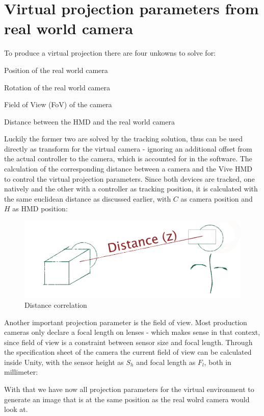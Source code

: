%
\section{Virtual projection parameters from real world camera}

To produce a virtual projection there are four unkowns to solve for:

\begin{my_list}
	\item Position of the real world camera
	\item Rotation of the real world camera
	\item Field of View (FoV) of the camera
	\item Distance between the HMD and the real world camera
\end{my_list}

Luckily the former two are solved by the tracking solution, thus can be used 
directly as transform for the virtual camera - ignoring an  additional offset 
from the actual controller to the camera, which is accounted for in the 
software.
\newline
The calculation of the corresponding distance between a 
camera and the Vive HMD to control the virtual projection parameters. Since 
both devices are tracked, one natively and the other with a controller as 
tracking position, it is calculated with the same euclidean distance as 
discussed earlier, with $C$ as camera position and $H$ as HMD position:


\begin{figure}[htb]
	\includegraphics[width=\textwidth]{_raw_resources/composition/Composition-Z-Distance.png}
	\caption{Distance correlation}
	\label{fig:projection:distance}
\end{figure}

Another important projection parameter is the field of view. Most production 
cameras only declare a focal length on lenses - which makes sense in that 
context, since field of view is a constraint between sensor size and focal 
length. Through the specification sheet of the camera the current field of view 
can be calculated inside Unity, with the sensor height as $S_h$ and focal 
length as $F_l$, both in millimeter:


With that we have now all projection parameters for the virtual environment to 
generate an image that is at the same position as the real wolrd camera would 
look at.
